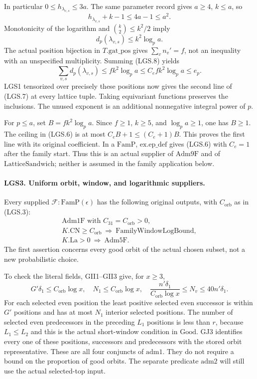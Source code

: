 \documentclass[11pt,a4paper]{article}
\numberwithin{equation}{section}
\theoremstyle{remark}\newtheorem{remark}[theorem]{Remark}
\begin{document}
In particular \(0\le h_{\lambda_{v,s}}\le3a\).
The same parameter record gives \(a\ge4\), \(k\le a\), so
\[
       h_{\lambda_{v,s}}+k-1\le4a-1\le a^2.
 \]
Monotonicity of the logarithm and
\(\binom{k}{2}\le k^2/2\) imply
\[
 d_p(\lambda_{v,s})\le k^2\log_p a.                   \tag{LGS.8}
\]
The actual position bijection in \(T.\mathrm{gat\_\allowbreak pos}\) gives
\(\sum_v n_v'=f\), not an inequality with an unspecified
multiplicity.  Summing (LGS.8) yields
\[
 \sum_{v,s}d_p(\lambda_{v,s})
       \le fk^2\log_p a\le C_e fk^2\log_p a\le e_p.
 \]
LGS1 tensorized over precisely these positions now gives the
second line of (LGS.7) at every lattice tuple.  Taking equivariant
functions preserves the inclusions.  The unused exponent is an
additional nonnegative integral power of \(p\).

For \(p\le a\), set \(B=fk^2\log_p a\).  Since \(f\ge1\),
\(k\ge5\), and \(\log_p a\ge1\), one has \(B\ge1\).
The ceiling in (LGS.6) is at most \(C_eB+1\le(C_e+1)B\).
This proves the first line with its original coefficient.
In a \(\mathrm{FamP}\), \(\mathrm{ex.ep\_\allowbreak def}\) gives (LGS.6)
with \(C_e=1\) after the family start.  Thus this is an actual
supplier of \(\mathrm{Adm9F}\) and of
\(\mathrm{LatticeSandwich}\); neither is assumed in the
family application below.

\paragraph{LGS3. Uniform orbit, window, and logarithmic suppliers.}
\label{claim:LGS3}
Every supplied \(\mathcal F:\mathrm{FamP}(\epsilon)\) has the
following original outputs, with \(C_{\mathrm{orb}}\) as in
(LGS.3):
\[
 \begin{gathered}
 \mathrm{Adm1F}\text{ with }C_{31}=C_{\mathrm{orb}}>0,\\
 K.\mathrm{CN}\ge C_{\mathrm{orb}}
       \ \Longrightarrow\ \mathrm{FamilyWindowLogBound},\\
 K.\mathrm{La}>0
       \ \Longrightarrow\ \mathrm{Adm5F}.
 \end{gathered}                                                   \tag{LGS.9}
\]
The first assertion concerns every good orbit of the actual
chosen subset, not a new probabilistic choice.

To check the literal fields, GII1--GII3 give, for \(x\ge3\),
\[
 G'\delta_1\le C_{\mathrm{orb}}\log x,\quad
 N_1\le C_{\mathrm{orb}}\log x,\quad
 \frac{n'\delta_1}{C_{\mathrm{orb}}\log x}
       \le N_v\le40n'\delta_1.                         \tag{LGS.10}
\]
For each selected even position the least positive selected
even successor is within \(G'\) positions and has at most
\(N_1\) interior selected positions.  The number of selected
even predecessors in the preceding \(L_1\) positions is less
than \(r\), because \(L_1\le L_2\) and this is the actual
short-window condition in \(\mathrm{Good}\).
GJ3 identifies every one of these positions, successors and
predecessors with the stored orbit representative.
These are all four conjuncts of \(\mathrm{adm1}\).
They do not require a bound on the proportion of good orbits.
The separate predicate \(\mathrm{adm2}\) will still use the
actual selected-top input.
\end{document}
